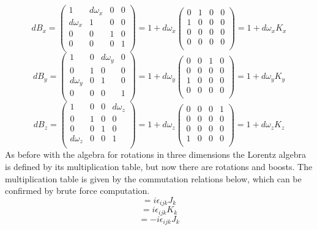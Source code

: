 \begin{equation}
dB_x = 
\begin{pmatrix}
1 & d\omega_x & 0 & 0 \\
d\omega_x & 1 & 0 & 0 \\
0 & 0 & 1 & 0 \\
0 & 0 & 0 & 1 \\
\end{pmatrix}
= 1 + d\omega_x 
\begin{pmatrix}
0 & 1 & 0 & 0 \\
1 & 0 & 0 & 0 \\
0 & 0 & 0 & 0 \\
0 & 0 & 0 & 0 \\
\end{pmatrix}
= 1 + d\omega_x K_x
\end{equation}
\begin{equation}
dB_y = 
\begin{pmatrix}
1 & 0 & d\omega_y & 0 \\
0 & 1 & 0 & 0 \\
d\omega_y & 0 & 1 & 0 \\
0 & 0 & 0 & 1 \\
\end{pmatrix}
= 1 + d\omega_y
\begin{pmatrix}
0 & 0 & 1 & 0 \\
0 & 0 & 0 & 0 \\
1 & 0 & 0 & 0 \\
0 & 0 & 0 & 0 \\
\end{pmatrix}
= 1 + d\omega_y K_y
\end{equation}
\begin{equation}
dB_z = 
\begin{pmatrix}
1 & 0 & 0 & d\omega_z \\
0 & 1 & 0 & 0 \\
0 & 0 & 1 & 0 \\
d\omega_z & 0 & 0 & 1 \\
\end{pmatrix}
= 1 + d\omega_z
\begin{pmatrix}
0 & 0 & 0 & 1 \\
0 & 0 & 0 & 0 \\
0 & 0 & 0 & 0 \\
1 & 0 & 0 & 0 \\
\end{pmatrix}
= 1 + d\omega_z K_z
\end{equation}
As before with the algebra for rotations in three dimensions the Lorentz algebra is defined by its multiplication table, but now there are rotations and boosts. The multiplication table is given by the commutation relations below, which can be confirmed by brute force computation.  
\begin{equation}
[J_i, J_j] = i\epsilon_{ijk}J_k
\end{equation}
\begin{equation}
[J_i, K_j] = i\epsilon_{ijk}K_k
\end{equation}
\begin{equation}
[K_i, K_j] = -i\epsilon_{ijk}J_k
\end{equation}


